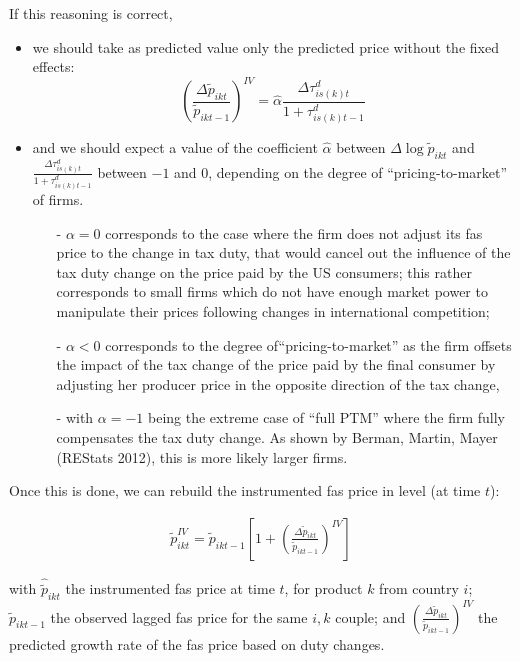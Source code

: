 \documentclass[a4paper,12pt]{article}
\begin{document}
If this reasoning is correct,
\begin{itemize}
\item we should take as predicted value only the predicted price without the fixed effects:
$$\left(\frac{\Delta \widetilde{p}_{ikt}}{\widetilde{p}_{ikt-1}}\right)^{IV} = \widehat{\alpha}\frac{\Delta \tau^d_{is(k)t}}{1+\tau_{is(k)t-1}^d} $$
\item and we should expect a value of the coefficient $\widehat{\alpha}$ between $\Delta \log \widetilde{p}_{ikt}$ and $\frac{\Delta \tau^d_{is(k)t}}{1+\tau_{is(k)t-1}^d} $ between $-1$ and $0$, depending on the degree of ``pricing-to-market'' of firms.
    \begin{itemize}
    \item[-] $\alpha = 0$ corresponds to the case where the firm does not adjust its fas price to the change in tax duty, that would cancel out the influence of the tax duty change on the price paid by the US consumers; this rather corresponds to small firms which do not have enough market power to manipulate their prices following changes in international competition;
    \item[-] $\alpha <0$ corresponds to the degree of``pricing-to-market'' as the firm offsets the impact of the tax change of the price paid by the final consumer by adjusting her producer price in the opposite direction of the tax change,
    \item[-] with $\alpha = -1$ being the extreme case of ``full PTM'' where the firm fully compensates the tax duty change. As shown by Berman, Martin, Mayer (REStats 2012), this is more likely larger firms.
    \end{itemize}
\end{itemize}

Once this is done, we can rebuild the instrumented fas price in level (at time $t$):

\begin{eqnarray*}
\widetilde{p}^{IV}_{ikt} = \widetilde{p}_{ikt-1}\left[1 + \left(\frac{\Delta \widetilde{p}_{ikt}}{\widetilde{p}_{ikt-1}}\right)^{IV}\right]
\end{eqnarray*}

with $\widehat{\widetilde{p}}_{ikt}$ the instrumented fas price at time $t$, for product $k$ from country $i$; $\widetilde{p}_{ikt-1}$ the observed lagged fas price for the same $i,k$ couple; and $ \left(\frac{\Delta \widetilde{p}_{ikt}}{\widetilde{p}_{ikt-1}}\right)^{IV}$ the predicted growth rate of the fas price based on duty changes.
\end{document}
